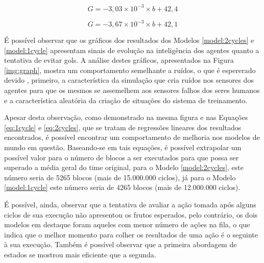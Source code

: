 \begin{equation}
    \label{eq:2cycles}
    G=-3,03\times 10^{-3}\times b+42,4
\end{equation}

\begin{equation}
    \label{eq:1cycle}
    G=-3,67\times 10^{-3} \times b+42,1
\end{equation}

É possível observar que os gráficos dos resultados dos Modelos
\ref{model:2cycles} e \ref{model:1cycle} apresentam sinais de evolução na
inteligência dos agentes quanto a tentativa de evitar gols. A análise destes
gráficos, apresentados na Figura \ref{img:graph}, mostra um comportamento
semelhante a ruídos, o que é espererado devido , primeiro, a
característica da simulação que cria ruídos nos sensores dos agentes para que os
mesmos se assemelhem aos sensores falhos dos seres humanos e a característica
aleatória da criação de situações do sistema de treinamento.

Apesar desta observação, como demonstrado na mesma figura e nas Equações
\ref{eq:1cycle} e \ref{eq:2cycles}, que se tratam de regressões lineares dos
resultados encontrados, é possível encontrar um comportamento de melhoria nos
modelos de mundo em questão. Baseando-se em tais equações, é possível extrapolar
um possível valor para o número de blocos a ser executados para que possa ser
superado a média geral do time original, para o Modelo \ref{model:2cycles}, este
número seria de 5265 blocos (mais de 15.000.000 ciclos), já para o Modelo
\ref{model:1cycle} este número seria de 4265 blocos (mais de 12.000.000 ciclos).

É possível, ainda, observar que a tentativa de avaliar a ação tomada após alguns ciclos
de sua execução não apresentou os frutos esperados, pelo contrário, os dois
modelos em destaque foram aqueles com menor número de ações na fila, o que
indica que o melhor momento para colher os resultados de uma ação é o seguinte à
sua execução. Também é
possível observar que a primeira abordagem de estados se mostrou mais
eficiente que a segunda.